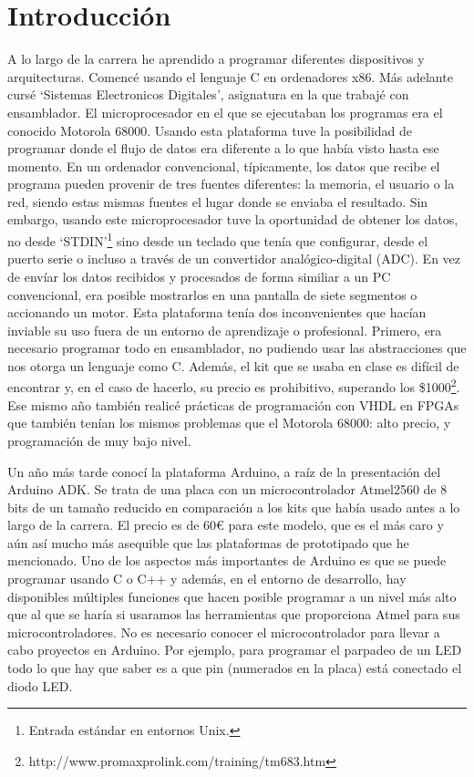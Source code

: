 

\section{Introducción}
A lo largo de la carrera he aprendido a programar diferentes dispositivos y arquitecturas. Comencé usando el lenguaje C en ordenadores x86.  Más adelante cursé `Sistemas Electronicos Digitales', asignatura en la que trabajé con ensamblador.  El microprocesador en el que se ejecutaban los programas era el conocido Motorola 68000. Usando esta plataforma tuve la posibilidad de programar donde el flujo de datos era diferente a lo que había visto hasta ese momento.  En un ordenador convencional, típicamente, los datos que recibe el programa pueden provenir de tres fuentes diferentes: la memoria, el usuario o la red, siendo estas mismas fuentes el lugar donde se enviaba el resultado.  Sin embargo, usando este microprocesador tuve la oportunidad de obtener los datos, no desde `STDIN'\footnote{Entrada estándar en entornos Unix.} sino desde un teclado que tenía que configurar, desde el puerto serie o incluso a través de un convertidor analógico-digital (ADC).  En vez de envíar los datos recibidos y procesados de forma similiar a un PC convencional, era posible mostrarlos en una pantalla de siete segmentos o accionando un motor.  Esta plataforma tenía dos inconvenientes que hacían inviable su uso fuera de un entorno de aprendizaje o profesional.  Primero, era necesario programar todo en ensamblador, no pudiendo usar las abstracciones que nos otorga un lenguaje como C.  Además, el kit que se usaba en clase es difícil de encontrar y, en el caso de hacerlo, su precio es prohibitivo, superando los \$1000\footnote{http://www.promaxprolink.com/training/tm683.htm}.  Ese mismo año también realicé prácticas de programación con VHDL en FPGAs que también tenían los mismos problemas que el Motorola 68000: alto precio, y programación de muy bajo nivel.

Un año más tarde conocí la plataforma Arduino, a raíz de la presentación del Arduino ADK. Se trata de una placa con un microcontrolador Atmel2560 de 8 bits de un tamaño reducido en comparación a los kits que había usado antes a lo largo de la carrera.  El precio es de 60\euro{} para este modelo, que es el más caro y aún así mucho más asequible que las plataformas de prototipado que he mencionado.  Uno de los aspectos más importantes de Arduino es que se puede programar usando C o C++ y además, en el entorno de desarrollo, hay disponibles múltiples funciones que hacen posible programar a un nivel más alto que al que se haría si usaramos las herramientas que proporciona Atmel para sus microcontroladores.  No es necesario conocer el microcontrolador para llevar a cabo proyectos en Arduino.  Por ejemplo, para programar el parpadeo de un LED todo lo que hay que saber es a que pin (numerados en la placa) está conectado el diodo LED.

